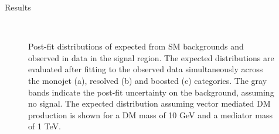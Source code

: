 \begin{section}{Results}
\begin{figure}[hbtp]\begin{center}
  \\
 \caption{
   Post-fit distributions of \ETm expected from SM backgrounds and observed in data in the signal region. The expected distributions are 
   evaluated after fitting to the observed data simultaneously across the monojet (a), resolved (b) and boosted (c) categories. 
   The gray bands indicate the post-fit uncertainty on the background, assuming no signal. The expected distribution assuming vector mediated DM production 
   is shown for a DM mass of 10 GeV and a mediator mass of 1 TeV.
 }
 \label{fig:post_fit_plots}\end{center}\end{figure}


\end{section}
